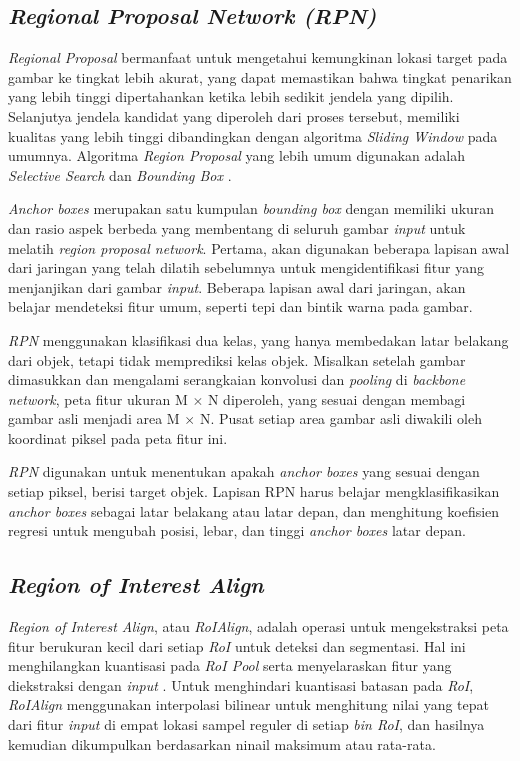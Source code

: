 \subsection{\textit{Regional Proposal Network (RPN)}}
\label{subsec:rpn}

\textit{Regional Proposal} bermanfaat untuk mengetahui kemungkinan lokasi target pada gambar ke tingkat lebih akurat, yang dapat memastikan bahwa tingkat penarikan yang lebih tinggi dipertahankan ketika lebih sedikit jendela yang dipilih. Selanjutya jendela kandidat yang diperoleh dari proses tersebut, memiliki kualitas yang lebih tinggi dibandingkan dengan algoritma \textit{Sliding Window} pada umumnya. Algoritma \textit{Region Proposal} yang lebih umum digunakan adalah \textit{Selective Search} dan \textit{Bounding Box} \citep{rpn}.

\textit{Anchor boxes} merupakan satu kumpulan \textit{bounding box} dengan memiliki ukuran dan rasio aspek berbeda yang membentang di seluruh gambar \textit{input} untuk melatih \textit{region proposal network}. Pertama, akan digunakan beberapa lapisan awal dari jaringan yang telah dilatih sebelumnya untuk mengidentifikasi fitur yang menjanjikan dari gambar \textit{input}. Beberapa lapisan awal dari jaringan, akan belajar mendeteksi fitur umum, seperti tepi dan bintik warna pada gambar.

\textit{RPN} menggunakan klasifikasi dua kelas, yang hanya membedakan latar belakang dari objek, tetapi tidak memprediksi kelas objek. Misalkan setelah gambar dimasukkan dan mengalami serangkaian konvolusi dan \textit{pooling} di \textit{backbone network}, peta fitur ukuran M $\times$ N diperoleh, yang sesuai dengan membagi gambar asli menjadi area M $\times$ N. Pusat setiap area gambar asli diwakili oleh koordinat piksel pada peta fitur ini. 

\textit{RPN} digunakan untuk menentukan apakah \textit{anchor boxes} yang sesuai dengan setiap piksel, berisi target objek. Lapisan RPN harus belajar mengklasifikasikan \textit{anchor boxes} sebagai latar belakang atau latar depan, dan menghitung koefisien regresi untuk mengubah posisi, lebar, dan tinggi \textit{anchor boxes} latar depan.

\subsection{\textit{Region of Interest Align}}
\label{roialign}

\textit{Region of Interest Align}, atau \textit{RoIAlign}, adalah operasi untuk mengekstraksi peta fitur berukuran kecil dari setiap \textit{RoI} untuk deteksi dan segmentasi. Hal ini menghilangkan kuantisasi pada \textit{RoI Pool} serta menyelaraskan fitur yang diekstraksi dengan \textit{input} \citep{mask-rcnn}. Untuk menghindari kuantisasi batasan pada \textit{RoI}, \textit{RoIAlign} menggunakan interpolasi bilinear untuk menghitung nilai yang tepat dari fitur \textit{input} di empat lokasi sampel reguler di setiap \textit{bin RoI}, dan hasilnya kemudian dikumpulkan berdasarkan ninail maksimum atau rata-rata. 

